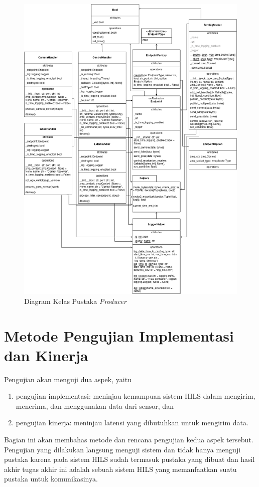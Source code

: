 \begin{figure}[h!]
    \centering
    \includegraphics[width=1.0\textwidth]{resources/chapter-4/producer-class_diagram.png}
	\caption{Diagram Kelas Pustaka \textit{Producer}}
    \label{chapter-4-producer-class-diagram}
\end{figure}

\section{Metode Pengujian Implementasi dan Kinerja}

Pengujian akan menguji dua aspek, yaitu
\begin{enumerate}
	\item pengujian implementasi: meninjau kemampuan sistem HILS dalam mengirim,
		menerima, dan menggunakan data dari sensor, dan
	\item pengujian kinerja: meninjau latensi yang dibutuhkan untuk mengirim
		data.
\end{enumerate}
Bagian ini akan membahas metode dan rencana pengujian kedua aspek tersebut.
Pengujian yang dilakukan langsung menguji sistem dan tidak hanya menguji pustaka
karena pada sistem HILS sudah termasuk pustaka yang dibuat dan hasil akhir
tugas akhir ini adalah sebuah sistem HILS yang memanfaatkan suatu pustaka untuk
komunikasinya.

